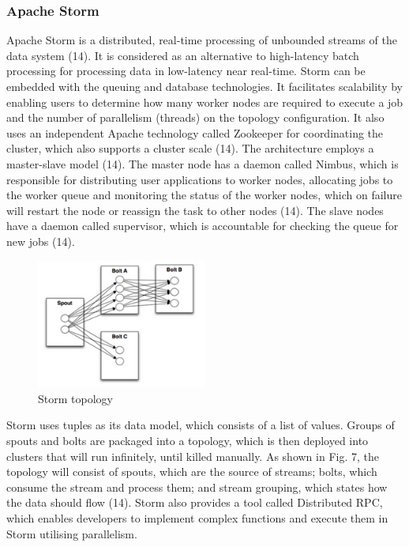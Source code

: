 \subsubsection{Apache Storm} \label{subsubsec-lr-reallayer-storm}
Apache Storm is a distributed, real-time processing of unbounded streams of the data system (14). It is considered as an alternative to high-latency batch processing for processing data in low-latency near real-time. Storm can be embedded with the queuing and database technologies. It facilitates scalability by enabling users to determine how many worker nodes are required to execute a job and the number of parallelism (threads) on the topology configuration. It also uses an independent Apache technology called Zookeeper for coordinating the cluster, which also supports a cluster scale (14). The architecture employs a master-slave model (14). The master node has a daemon called Nimbus, which is responsible for distributing user applications to worker nodes, allocating jobs to the worker queue and monitoring the status of the worker nodes, which on failure will restart the node or reassign the task to other nodes (14). The slave nodes have a daemon called supervisor, which is accountable for checking the queue for new jobs (14). 

\begin{figure}[H]
\centering
\includegraphics[width=0.5\textwidth]{Figures/storm.png}
\caption{Storm topology}\label{fig-real-storm}
\end{figure}

Storm uses tuples as its data model, which consists of a list of values. Groups of spouts and bolts are packaged into a topology, which is then deployed into clusters that will run infinitely, until killed manually. As shown in Fig. 7, the topology will consist of spouts, which are the source of streams; bolts, which consume the stream and process them; and stream grouping, which states how the data should flow (14). Storm also provides a tool called Distributed RPC, which enables developers to implement complex functions and execute them in Storm utilising parallelism.

